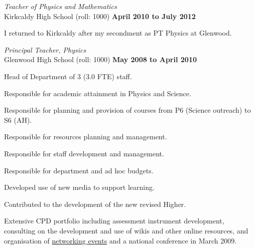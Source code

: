 \documentclass[10pt]{article}
\newenvironment{outerlist}[1][\enskip\textbullet]%
        {\begin{itemize}[#1]}{\end{itemize}%
         \vspace{-.6\baselineskip}}
\newenvironment{innerlist}[1][\enskip\textbullet]%
        {\begin{compactitem}[#1]}{\end{compactitem}}
\begin{document}
\begin{outerlist}

\item[] \textit{Teacher of Physics and Mathematics}\\Kirkcaldy High School (roll: 1000)%
        \hfill \textbf{April 2010 to July 2012}
\begin{innerlist}
\item I returned to Kirkcaldy after my secondment as PT Physics at Glenwood. %
\end{innerlist}

\item[] \textit{Principal Teacher, Physics}\\Glenwood High School (roll: 1000)%
        \hfill \textbf{May 2008 to April 2010}
\begin{innerlist}
\item Head of Department of 3 (3.0 FTE) staff.
\item Responsible for academic attainment in Physics and Science.
\item Responsible for planning and provision of courses from P6 (Science outreach) to S6 (AH).
\item Responsible for resources planning and management.
\item Responsible for staff development and management.
\item Responsible for department and ad hoc budgets.
\item Developed use of new media to support learning.
\item Contributed to the development of the new revised Higher.
\item Extensive CPD portfolio including assessment instrument development, consulting on the development and use of wikis and other online resources, and organisation of \href{http://teachingphysics.pbwiki.org/}{networking events} and a national conference in March 2009. %
\end{innerlist}


\end{outerlist}
\end{document}
